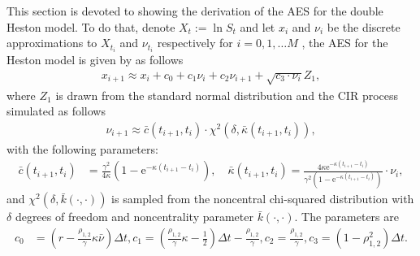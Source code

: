 \documentclass[]{interact}
\theoremstyle{plain}%
\theoremstyle{definition}
\theoremstyle{remark}
\begin{document}


This section is devoted to showing the derivation of the AES for the double Heston model. To do that, denote $X_t:=\ln S_t$ and let $x_i$  and  $\nu_{i}$ be the discrete approximations to $X_{t_i}$ and $ \nu_{t_i}$ respectively for $ i = 0, 1, \ldots M$ ,  the AES for the Heston model is given by \cite{oosterlee2019mathematical} as follows
\begin{align*}
  x_{i+1} \approx  x_{i}+c_0+c_1 \nu_{i}+c_2 \nu_{i+1}+\sqrt{c_3 \cdot \nu_{i}}Z_1,  
\end{align*}
where $Z_1$ is drawn from the standard normal distribution and the CIR process \cite{cox1985theory} simulated as follows
\begin{align}\label{eq:HestonAESVariance}
    \nu_{i+1}\approx \bar{c}(t_{i+1}, t_{i})\cdot \chi^{2}\left(\delta, \bar{\kappa}\left(t_{i+1}, t_{i}\right)\right),
\end{align}
with the following parameters:
\begin{align*}
\bar{c}\left(t_{i+1}, t_{i}\right) &=\frac{\gamma^2}{4 \kappa}\left(1-\mathrm{e}^{-\kappa\left(t_{i+1}-t_{i}\right)}\right), \quad 
\bar{\kappa}\left(t_{i+1}, t_{i}\right) =\frac{4 \kappa \mathrm{e}^{-\kappa\left(t_{i+1}-t_{i}\right)}}{\gamma^{2}\left(1-\mathrm{e}^{-\kappa\left(t_{i+1}-t_{i}\right)}\right)} \cdot \nu_{i}, 
\end{align*}
and $\chi^2(\delta,\bar{k}(\cdot , \cdot))$ is sampled from the noncentral chi-squared distribution with $\delta$ degrees of freedom and noncentrality parameter $\bar{k}(\cdot , \cdot)$. The parameters are 
$$
\begin{aligned}
c_0&=\left(r- \frac{\rho_{1, 2}}{\gamma}\kappa \bar{\nu}\right)\Delta t, 
 c_1=\left(\frac{\rho_{1, 2}}{\gamma}\kappa-\frac{1}{2} \right)\Delta t -\frac{\rho_{1, 2}}{\gamma},  
 c_2=\frac{\rho_{1, 2}}{\gamma}, 
 c_3=\left(1-\rho_{1,2}^{2} \right)\Delta t.
\end{aligned}
$$
\end{document}
